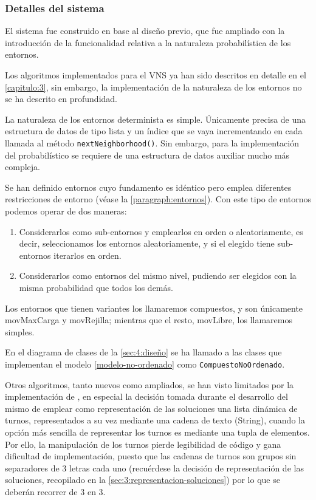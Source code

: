 \subsubsection{Detalles del sistema}
\label{sec:4:detalles-sistema}

El sistema fue construido en base al diseño previo, que fue ampliado con la introducción de la funcionalidad relativa a la naturaleza probabilística de los entornos.

Los algoritmos implementados para el VNS ya han sido descritos en detalle en el \autoref{capitulo:3}, sin embargo, la implementación de la naturaleza de los entornos no se ha descrito en profundidad.

La naturaleza de los entornos determinista es simple. Únicamente precisa de una estructura de datos de tipo lista y un índice que se vaya incrementando en cada llamada al método \texttt{nextNeighborhood()}. Sin embargo, para la implementación del probabilístico se requiere de una estructura de datos auxiliar mucho más compleja.

Se han definido entornos cuyo fundamento es idéntico pero emplea diferentes restricciones de entorno (véase la \autoref{paragraph:entornos}). Con este tipo de entornos podemos operar de dos maneras: 
\begin{enumerate}[label={(\Alph*)}]
	\item Considerarlos como sub-entornos y emplearlos en orden o aleatoriamente, es decir, seleccionamos los entornos aleatoriamente, y si el elegido tiene sub-entornos iterarlos en orden.
	\item \label{modelo-no-ordenado} Considerarlos como entornos del mismo nivel, pudiendo ser elegidos con la misma probabilidad que todos los demás.
\end{enumerate}

Los entornos que tienen variantes los llamaremos compuestos, y son únicamente movMaxCarga y movRejilla; mientras que el resto, movLibre, los llamaremos simples.

En el diagrama de clases de la \autoref{sec:4:diseño} se ha llamado a las clases que implementan el modelo \ref{modelo-no-ordenado} como \texttt{CompuestoNoOrdenado}.

Otros algoritmos, tanto nuevos como ampliados, se han visto limitados por la implementación de \legacy{}, en especial la decisión tomada durante el desarrollo del mismo de emplear como representación de las soluciones una lista dinámica de turnos, representados a su vez mediante una cadena de texto (String), cuando la opción más sencilla de representar los turnos es mediante una tupla de elementos. Por ello, la manipulación de los turnos pierde legibilidad de código y gana dificultad de implementación, puesto que las cadenas de turnos son grupos sin separadores de 3 letras cada uno (recuérdese la decisión de representación de las soluciones, recopilado en la \autoref{sec:3:representacion-soluciones}) por lo que se deberán recorrer de 3 en 3.

